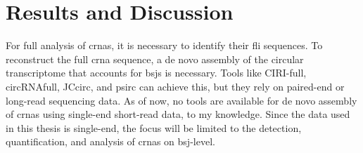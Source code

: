 \chapter{Results and Discussion}

For full analysis of \glspl{crna}, it is necessary to identify their \gls{fli}
sequences.
To reconstruct the full \gls{crna} sequence, a de novo assembly of the circular
transcriptome that accounts for \glspl{bsj} is necessary.
Tools like CIRI-full, circRNAfull, JCcirc, and psirc can achieve this, but they
rely on paired-end or long-read sequencing data.
As of now, no tools are available for de novo assembly of \glspl{crna} using
single-end short-read data, to my knowledge.
Since the data used in this thesis is single-end, the focus will be limited to
the detection, quantification, and analysis of \glspl{crna} on \gls{bsj}-level.





